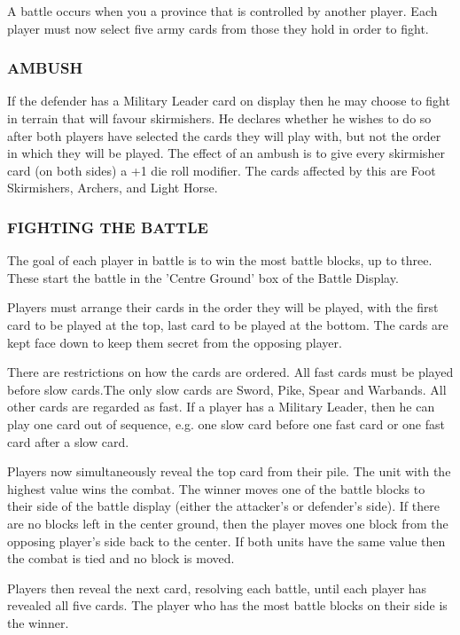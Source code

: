 A battle occurs when you a province that is controlled by another player. Each player must now select five army cards from those they hold in order to fight.

\subsubsection{AMBUSH}

If the defender has a Military Leader card on display then he may choose to fight in terrain that will favour skirmishers. He declares whether he wishes to do so after both players have selected the cards they will play with, but not the order in which they will be played. The effect of an ambush is to give every skirmisher card (on both sides) a +1 die roll modifier. The cards affected by this are Foot Skirmishers, Archers, and Light Horse.

\subsubsection{FIGHTING THE BATTLE}

The goal of each player in battle is to win the most battle blocks, up to three. These start the battle in the 'Centre Ground’ box of  the Battle Display.

Players must arrange their cards in the order they will be played, with the first card to be played at the top, last card to be played at the bottom. The cards are kept face down to keep them secret from the opposing player.

There are restrictions on how the cards are ordered. All fast cards must be played before slow cards.The only slow cards are Sword, Pike, Spear and Warbands. All other cards are regarded as fast. If a player has a Military Leader, then he can play one card out of sequence, e.g. one slow card before one fast card or one fast card after a slow card.

Players now simultaneously reveal the top card from their pile. The unit with the highest value wins the combat. The winner moves one of the battle blocks to their side of the battle display (either the attacker's or defender's side). If there are no blocks left in the center ground, then the player moves one block from the opposing player's side back to the center. If both units have the same value then the combat is tied and no block is moved.

Players then reveal the next card, resolving each battle, until each player has revealed all five cards. The player who has the most battle blocks on their side is the winner.

